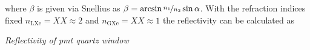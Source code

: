 where $ \beta $ is given via Snellius as $ \beta = \arcsin{\nicefrac{n_1}{n_2} \sin{\alpha} } $.
With the refraction indices fixed $ n_\mathrm{LXe} = XX \approx 2 $ and $ n_\mathrm{GXe} = XX \approx 1 $ the reflectivity can be calculated as


\emph{Reflectivity of \gls{pmt} quartz window}














